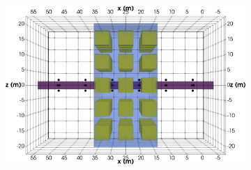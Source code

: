 \documentclass[preprint,authoryear,12pt]{elsarticle}
\begin{document}
\begin{figure}[htp]{}
\begin{center}
\begin{subfigure}{0.54\linewidth}
      \end{subfigure}
      \hspace{-3.0cm}
      \qquad
      \begin{subfigure}{0.54\linewidth}
         \label{fig:SurveyDesign_StraightTunnel_5mCheckerBoard_TestBlk_South}
         \includegraphics[trim=0cm 0cm 0cm 0cm, clip=true,width=\linewidth]{./figures/Fig18b.png}
      \end{subfigure}
      \vspace{0.2cm}


\end{center}
\end{figure}
\end{document}
